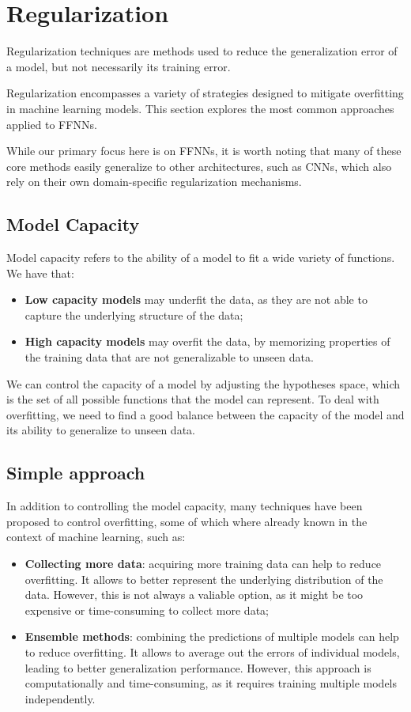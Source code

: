 \section{Regularization}
Regularization techniques are methods used to reduce the generalization error of a model, but not necessarily its training error.

Regularization encompasses a variety of strategies designed to mitigate overfitting in machine learning models. 
This section explores the most common approaches applied to FFNNs.

While our primary focus here is on FFNNs, it is worth noting that many of these core methods easily generalize to other architectures,
such as CNNs, which also rely on their own domain-specific regularization mechanisms.

\subsection{Model Capacity}
Model capacity refers to the ability of a model to fit a wide variety of functions. We have that:

\begin{itemize}
    \item \textbf{Low capacity models} may underfit the data, as they are not able to capture the underlying structure of the data;
    
    \item \textbf{High capacity models} may overfit the data, by memorizing properties of the training data that are not generalizable to unseen data.
\end{itemize}

We can control the capacity of a model by adjusting the hypotheses space, which is the set of all possible functions that the model can represent.
To deal with overfitting, we need to find a good balance between the capacity of the model and its ability to generalize to unseen data.

\subsection{Simple approach}
In addition to controlling the model capacity, many techniques have been proposed to control overfitting, 
some of which where already known in the context of machine learning, such as:

\begin{itemize}
    \item \textbf{Collecting more data}: acquiring more training data can help to reduce overfitting. 
    It allows to better represent the underlying distribution of the data.
    However, this is not always a valiable option, as it might be too expensive or time-consuming to collect more data;
    
    \item \textbf{Ensemble methods}: combining the predictions of multiple models can help to reduce overfitting.
    It allows to average out the errors of individual models, leading to better generalization performance.
    However, this approach is computationally and time-consuming, as it requires training multiple models independently.
\end{itemize}

